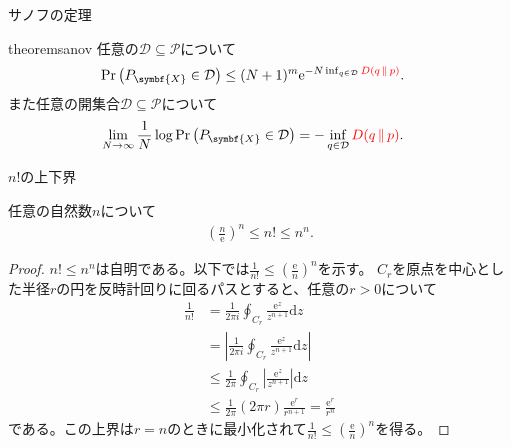 \documentclass[lualatex,handout]{beamer}
\newcommand{\mycolor}[2]{%
  \begingroup
  \colorlet{currentcolor}{.}%
  \color{#1}#2%
  \color{currentcolor}%
  \endgroup
}
\newcommand{\emm}[1]{\mycolor{red}{#1}}
\newcommand\KL[2]{D(#1\,\|\,#2)}
\theoremstyle{definition}
\begin{document}
\begin{frame}{サノフの定理}
\begin{restatable}[サノフの定理]{theorem}{sanov}
任意の$\mathcal{D}\subseteq\mathcal{P}$について
\begin{align*}
\Pr\left(P_{\symbf{X}} \in \mathcal{D}\right) &\le (N+1)^m \mathrm{e}^{-N\inf_{q\in \mathcal{D}} \emm{\KL{q}{p}}}.
\end{align*}
また任意の開集合$\mathcal{D}\subseteq\mathcal{P}$について
\begin{align*}
\lim_{N\to\infty}\frac1N\log \Pr\left(P_{\symbf{X}} \in \mathcal{D}\right) &= -\inf_{q\in \mathcal{D}} \emm{\KL{q}{p}}.
\end{align*}
\end{restatable}
\end{frame}



\begin{frame}{$n!$の上下界}
\footnotesize
\begin{lemma}
任意の自然数$n$について
\begin{align*}
\left(\frac{n}{\mathrm{e}}\right)^n\le n!\le n^n.
\end{align*}
\vspace{-1em}
\begin{proof}
$n!\le n^n$は自明である。以下では$\frac1{n!}\le \left(\frac{\mathrm{e}}{n}\right)^n$を示す。
%
$C_r$を原点を中心とした半径$r$の円を反時計回りに回るパスとすると、任意の$r>0$について
\begin{align*}
\frac1{n!} &= \frac1{2\pi i} \oint_{C_r} \frac{\mathrm{e}^z}{z^{n+1}}\mathrm{d}z\\
 &= \left|\frac1{2\pi i} \oint_{C_r} \frac{\mathrm{e}^z}{z^{n+1}}\mathrm{d}z\right|\\
&\le \frac1{2\pi } \oint_{C_r} \left|\frac{\mathrm{e}^z}{z^{n+1}}\right|\mathrm{d}z\\
&\le \frac1{2\pi } (2\pi r) \frac{\mathrm{e}^r}{r^{n+1}} = \frac{\mathrm{e}^r}{r^n}
\end{align*}
である。この上界は$r=n$のときに最小化されて$\frac1{n!}\le\left(\frac{\mathrm{e}}{n}\right)^n$を得る。
\end{proof}
\end{lemma}
\end{frame}
\fi
\end{document}
